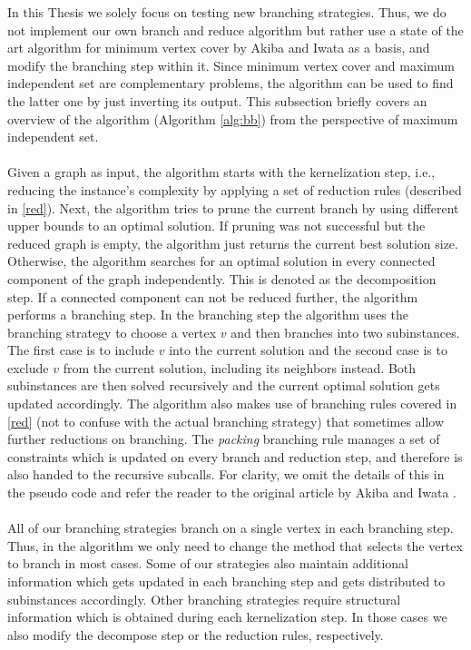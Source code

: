 \documentclass[]{article}
\begin{document}
In this Thesis we solely focus on testing new branching strategies. Thus, we do not implement our own branch and reduce algorithm but rather use a state of the art algorithm for minimum vertex cover by Akiba and Iwata \cite{AkibaIwata} as a basis, and modify the branching step within it. Since minimum vertex cover and maximum independent set are complementary problems, the algorithm can be used to find the latter one by just inverting its output. This subsection briefly covers an overview of the algorithm (Algorithm \ref{alg:bb}) from the perspective of maximum independent set.\paragraph{}
Given a graph as input, the algorithm starts with the kernelization step, i.e., reducing the instance's complexity by applying a set of reduction rules (described in \ref{red}). Next, the algorithm tries to prune the current branch by using different upper bounds to an optimal solution. If pruning was not successful but the reduced graph is empty, the algorithm just returns the current best solution size. Otherwise, the algorithm searches for an optimal solution in every connected component of the graph independently. This is denoted as the decomposition step. If a connected component can not be reduced further, the algorithm performs a branching step. In the branching step the algorithm uses the branching strategy to choose a vertex $v$ and then branches into two subinstances. The first case is to include $v$ into the current solution and the second case is to exclude $v$ from the current solution, including its neighbors instead. Both subinstances are then solved recursively and the current optimal solution gets updated accordingly. The algorithm also makes use of branching rules covered in \ref{red} (not to confuse with the actual branching strategy) that sometimes allow further reductions on branching. The \textit{packing} branching rule manages a set of constraints which is updated on every branch and reduction step, and therefore is also handed to the recursive subcalls. For clarity, we omit the details of this in the pseudo code and refer the reader to the original article by Akiba and Iwata \cite{AkibaIwata}. \paragraph{}  
All of our branching strategies branch on a single vertex in each branching step. Thus, in the algorithm we only need to change the method that selects the vertex to branch in most cases. Some of our strategies also maintain additional information which gets updated in each branching step and gets distributed to subinstances accordingly. Other branching strategies require structural information which is obtained during each kernelization step. In those cases we also modify the decompose step or the reduction rules, respectively. \paragraph{}
\end{document}
